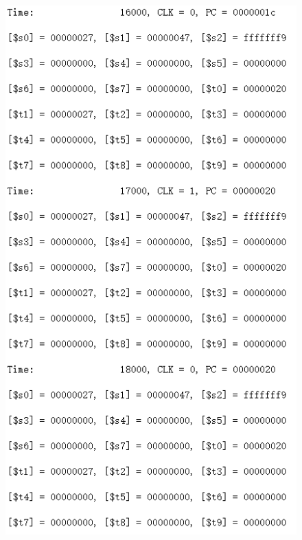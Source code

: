 \documentclass[12pt]{article}
\begin{document}
\begin{figure}[H]
\centering
\includegraphics[scale=1]{R6.jpg}
\end{figure}
\end{document}
